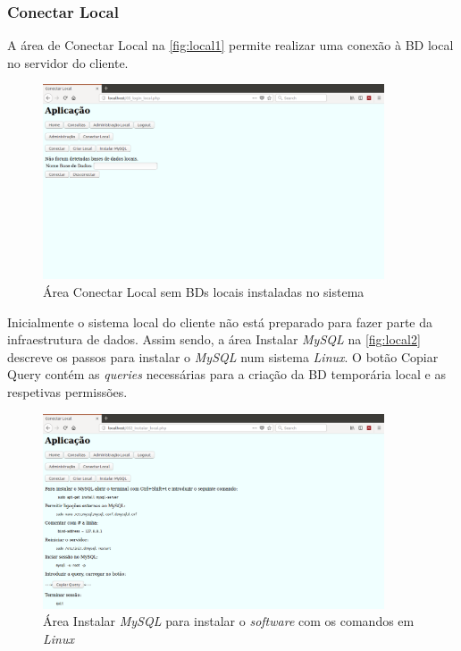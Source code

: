 \documentclass[11pt,twoside,a4paper]{report}
\begin{document}
\subsubsection{Conectar Local}
\label{subchap:local}
A área de Conectar Local na \autoref{fig:local1} permite realizar uma conexão à BD local no servidor do cliente.
	\begin{figure}[H]
		\centering
			\includegraphics[width=0.9\textwidth]{local04} %
			\caption[Área Conectar Local sem BDs locais]{Área Conectar Local sem BDs locais instaladas no sistema}
			\label{fig:local1}
	\end{figure}
Inicialmente o sistema local do cliente não está preparado para fazer parte da infraestrutura de dados. Assim sendo, a área Instalar \textit{MySQL} na \autoref{fig:local2} descreve os passos para instalar o \textit{MySQL} num sistema \textit{Linux}. O botão Copiar Query contém as \textit{queries} necessárias para a criação da BD temporária local e as respetivas permissões.
\begin{figure}[H]
	\centering
	\includegraphics[width=0.9\textwidth]{local01} %
	\caption{Área Instalar \textit{MySQL} para instalar o \textit{software} com os comandos em \textit{Linux}}
	\label{fig:local2}
\end{figure}
\end{document}
